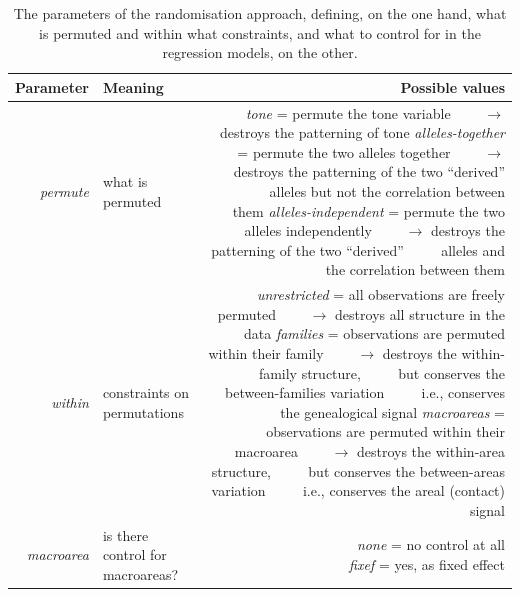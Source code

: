 \documentclass[twoside,onecolumn]{article}
\begin{document}
\begin{table}[h]
  \caption{The parameters of the randomisation approach, defining, on the one hand, what is permuted and within what constraints, and what to control for in the regression models, on the other.}
  \label{Tab:randomization_params}
  \centering
  \begin{tabularx}{\textwidth}{|r|X|r|}
    \toprule
    \textbf{Parameter} & \textbf{Meaning} & \textbf{Possible values} \\
    \midrule
    \textit{permute} & what is permuted & \makecell[l]{\textit{tone} = permute the tone variable\\~~~~$\rightarrow$ destroys the patterning of tone\\
      \textit{alleles-together} = permute the two alleles together\\~~~~$\rightarrow$ destroys the patterning of the two ``derived''\\~~~~ alleles but not the correlation between them\\
      \textit{alleles-independent} = permute the two alleles independently\\~~~~$\rightarrow$ destroys the patterning of the two ``derived''\\~~~~ alleles and the correlation between them} \\
    \midrule
    \textit{within} & constraints on permutations & \makecell[l]{\textit{unrestricted} = all observations are freely permuted\\~~~~$\rightarrow$ destroys all structure in the data\\
      \textit{families} = observations are permuted within their family\\~~~~$\rightarrow$ destroys the within-family structure,\\~~~~ but conserves the between-families variation\\~~~~ i.e., conserves the genealogical signal\\
      \textit{macroareas} = observations are permuted within their macroarea\\~~~~$\rightarrow$ destroys the within-area structure,\\~~~~ but conserves the between-areas variation\\~~~~ i.e., conserves the areal (contact) signal} \\
    \midrule
    \textit{macroarea} & is there control for macroareas? & \makecell[l]{\textit{none} = no control at all\\
      \textit{fixef} = yes, as fixed effect} \\
    \bottomrule
  \end{tabularx}
\end{table}
\end{document}
